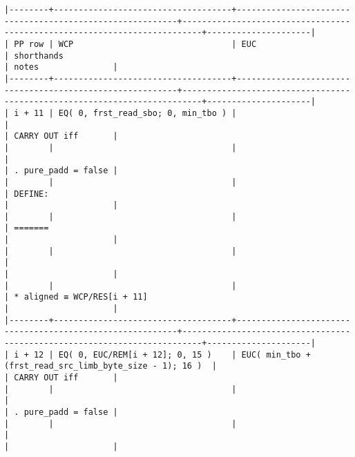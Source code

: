 \documentclass[varwidth=\maxdimen,margin=0.5cm,multi={verbatim}]{standalone}
\begin{document}
\begin{verbatim}
|--------+------------------------------------+----------------------------------------------------------+--------------------------------------------------------------------------+---------------------|
| PP row | WCP                                | EUC                                                      | shorthands                                                               | notes               |
|--------+------------------------------------+----------------------------------------------------------+--------------------------------------------------------------------------+---------------------|
| i + 11 | EQ( 0, frst_read_sbo; 0, min_tbo ) |                                                          |                                                                          | CARRY OUT iff       |
|        |                                    |                                                          |                                                                          | . pure_padd = false |
|        |                                    |                                                          | DEFINE:                                                                  |                     |
|        |                                    |                                                          | =======                                                                  |                     |
|        |                                    |                                                          |                                                                          |                     |
|        |                                    |                                                          | * aligned ≡ WCP/RES[i + 11]                                              |                     |
|--------+------------------------------------+----------------------------------------------------------+--------------------------------------------------------------------------+---------------------|
| i + 12 | EQ( 0, EUC/REM[i + 12]; 0, 15 )    | EUC( min_tbo + (frst_read_src_limb_byte_size - 1); 16 )  |                                                                          | CARRY OUT iff       |
|        |                                    |                                                          |                                                                          | . pure_padd = false |
|        |                                    |                                                          |                                                                          |                     |

\end{verbatim}
\end{document}
